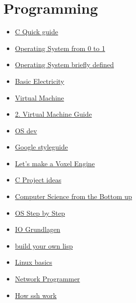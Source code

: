 \documentclass[a4paper, 12pt]{scrartcl}
\begin{document}
    \section {Programming}
    \begin{itemize}
        \item \href{https://www.tutorialspoint.com/cprogramming/c_quick_guide.htm}{C Quick guide}
        \item \href{file:///D:/Documents/ProgrammierenResources/Operating_Systems_From_0_to_1.pdf}{Operating System from 0 to 1}
        \item \href{https://ops-class.org/slides/2017-01-30-intro/}{Operating System briefly defined}
        \item \href{https://www.allaboutcircuits.com/textbook/}{Basic Electricity}
        \item \href{https://felixangell.com/blogs/virtual-machine-in-c}{Virtual Machine}
        \item \href{https://justinmeiners.github.io/lc3-vm/}{2. Virtual Machine Guide}
        \item \href{https://wiki.osdev.org/Main_Page}{OS dev}
        \item \href{https://google.github.io/styleguide/}{Google styleguide}
        \item \href{https://sites.google.com/site/letsmakeavoxelengine/home}{Let's make a Voxel Engine}
        \item \href{https://github.com/rby90/Project-Based-Tutorials-in-C}{C Project ideas}
        \item \href{http://www.bottomupcs.com/}{Computer Science from the Bottom up}
        \item \href{http://pages.cs.wisc.edu/~remzi/OSTEP/}{OS Step by Step}
        \item \href{https://www.bjoern-koester.de/iogrundlagen/}{IO Grundlagen}
        \item \href{http://www.buildyourownlisp.com/}{build your own lisp}
        \item \href{https://www.youtube.com/watch?v=IVquJh3DXUA}{Linux basics}
        \item \href{https://beej.us/guide/bgnet/html//index.html}{Network Programmer}
        \item \href{https://www.hostinger.com/tutorials/ssh-tutorial-how-does-ssh-work}{How ssh work}
    \end{itemize}
\end{document}
